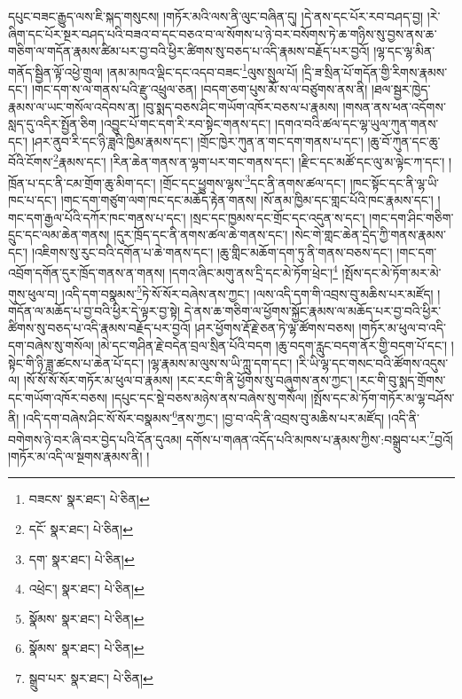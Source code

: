 དཔུང་བཟང་རྒྱུད་ལས་ཇི་སྐད་གསུངས། །གཏོར་མའི་ལས་ནི་ལུང་བཞིན་དུ། །དེ་ནས་དང་པོར་རབ་བཤད་བྱ། །རེ་ཞིག་དང་པོར་སྔར་བཤད་པའི་བཟའ་བ་དང་བཅའ་བ་ལ་སོགས་པ་ཉེ་བར་བསོགས་ཏེ་ཆ་གཉིས་སུ་བྱས་ནས་ཆ་གཅིག་ལ་གདོན་རྣམས་ཚིམ་པར་བྱ་བའི་ཕྱིར་ཚིགས་སུ་བཅད་པ་འདི་རྣམས་བརྗོད་པར་བྱའོ། །ལྷ་དང་ལྷ་མིན་གནོད་སྦྱིན་ལྟོ་འཕྱེ་གྲུལ། །ནམ་མཁའ་ལྡིང་དང་འདབ་བཟང་\footnote{བཟངས་  སྣར་ཐང་།  པེ་ཅིན། }ལུས་སྲུལ་པོ། །དྲི་ཟ་སྲིན་པོ་གདོན་གྱི་རིགས་རྣམས་དང་། །གང་དག་ས་ལ་གནས་པའི་རྫུ་འཕྲུལ་ཅན། །བདག་ཅག་པུས་མོ་ས་ལ་བཙུགས་ནས་ནི། །ཐལ་སྦྱར་ཁྱེད་རྣམས་ལ་ཡང་གསོལ་འདེབས་ན། །བུ་སྨད་བཅས་ཤིང་གཡོག་འཁོར་བཅས་པ་རྣམས། །གསན་ནས་ཕན་འདོགས་སླད་དུ་འདིར་སྤྱོན་ཅིག །འབྱུང་པོ་གང་དག་རི་རབ་སྟེང་གནས་དང་། །དགའ་བའི་ཚལ་དང་ལྷ་ཡུལ་ཀུན་གནས་དང་། །ཤར་ནུབ་རི་དང་ཉི་ཟླའི་ཁྱིམ་རྣམས་དང་། །གྲོང་ཁྱེར་ཀུན་ན་གང་དག་གནས་པ་དང་། །ཆུ་བོ་ཀུན་དང་ཆུ་བོའི་ངོགས་\footnote{དངོ་  སྣར་ཐང་།  པེ་ཅིན། }རྣམས་དང་། །རིན་ཆེན་གནས་ན་ལྷག་པར་གང་གནས་དང་། །རྫིང་དང་མཚོ་དང་ལུ་མ་ལྟེང་ཀ་དང་། །ཁྲོན་པ་དང་ནི་ངམ་གྲོག་ཆུ་མིག་དང་། །གྲོང་དང་ཕྱུགས་ལྷས་\footnote{དག་  སྣར་ཐང་།  པེ་ཅིན། }དང་ནི་ནགས་ཚལ་དང་། །ཁང་སྟོང་དང་ནི་ལྷ་ཡི་ཁང་པ་དང་། །གང་དག་གཙུག་ལག་ཁང་དང་མཆོད་རྟེན་གནས། །སོ་ནམ་ཁྱིམ་དང་གླང་པོའི་ཁང་རྣམས་དང་། །གང་དག་རྒྱལ་པོའི་དཀོར་ཁང་གནས་པ་དང་། །སྲང་དང་ཁྱམས་དང་གྲོང་དང་འདུན་ས་དང་། །གང་དག་ཤིང་གཅིག་དྲུང་དང་ལམ་ཆེན་གནས། །དུར་ཁྲོད་དང་ནི་ནགས་ཚལ་ཆེ་གནས་དང་། །སེང་གེ་གླང་ཆེན་དྲེད་ཀྱི་གནས་རྣམས་དང་། །འཇིགས་སུ་རུང་བའི་དགོན་པ་ཆེ་གནས་དང་། །ཆུ་གླིང་མཆོག་དག་ཏུ་ནི་གནས་བཅས་དང་། །གང་དག་འབྲོག་དགོན་དུར་ཁྲོད་གནས་ན་གནས། །དགའ་ཞིང་མགུ་ནས་དྲི་དང་མེ་ཏོག་ཕྲེང་།\footnote{འཕྲེང་།  སྣར་ཐང་།  པེ་ཅིན། } །སྤོས་དང་མེ་ཏོག་མར་མེ་གུས་ཕུལ་བ། །འདི་དག་བསྣམས་\footnote{སྣོམས་  སྣར་ཐང་།  པེ་ཅིན། }ཏེ་སོ་སོར་བཞེས་ནས་ཀྱང་། །ལས་འདི་དག་གི་འབྲས་བུ་མཆིས་པར་མཛོད། །གདོན་ལ་མཆོད་པ་བྱ་བའི་ཕྱིར་དེ་ལྟར་བྱ་སྟེ། དེ་ནས་ཆ་གཅིག་ལ་ཕྱོགས་སྐྱོང་རྣམས་ལ་མཆོད་པར་བྱ་བའི་ཕྱིར་ཚིགས་སུ་བཅད་པ་འདི་རྣམས་བརྗོད་པར་བྱའོ། །ཤར་ཕྱོགས་རྡོ་རྗེ་ཅན་ཏེ་ལྷ་ཚོགས་བཅས། །གཏོར་མ་ཕུལ་བ་འདི་དག་བཞེས་སུ་གསོལ། །མེ་དང་གཤིན་རྗེ་བདེན་བྲལ་སྲིན་པོའི་བདག །ཆུ་བདག་རླུང་བདག་ནོར་གྱི་བདག་པོ་དང་། །སྟེང་གི་ཉི་ཟླ་ཚངས་པ་ཆེན་པོ་དང་། །ལྷ་རྣམས་མ་ལུས་ས་ཡི་ཀླུ་དག་དང་། །རི་ཡི་ལྷ་དང་གསང་བའི་ཚོགས་འདུས་ལ། །སོ་སོ་སོ་སོར་གཏོར་མ་ཕུལ་བ་རྣམས། །རང་རང་གི་ནི་ཕྱོགས་སུ་བཞུགས་ནས་ཀྱང་། །རང་གི་བུ་སྨད་གྲོགས་དང་གཡོག་འཁོར་བཅས། །དཔུང་དང་སྡེ་བཅས་མཉེས་ནས་བཞེས་སུ་གསོལ། །སྤོས་དང་མེ་ཏོག་གཏོར་མ་ལྷ་བཤོས་ནི། །འདི་དག་བཞེས་ཤིང་སོ་སོར་བསྣམས་\footnote{སྣོམས་  སྣར་ཐང་།  པེ་ཅིན། }ནས་ཀྱང་། །བྱ་བ་འདི་ནི་འབྲས་བུ་མཆིས་པར་མཛོད། །འདི་ནི་བགེགས་ཉེ་བར་ཞི་བར་བྱེད་པའི་དོན་དུའམ། དགོས་པ་གཞན་འདོད་པའི་མཁས་པ་རྣམས་ཀྱིས་:བསྒྲུབ་པར་\footnote{སྒྲུབ་པར་  སྣར་ཐང་།  པེ་ཅིན། }བྱའོ། །གཏོར་མ་འདི་ལ་སྔགས་རྣམས་ནི། །
